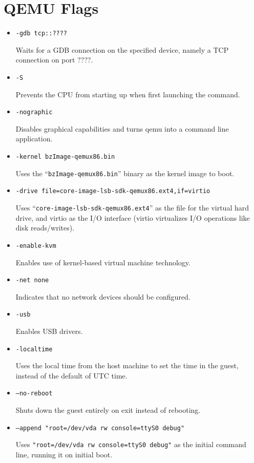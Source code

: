 \section{QEMU Flags}

\begin{itemize}
  \item \texttt{-gdb tcp::????}

    Waits for a GDB connection on the specified device, namely a TCP
    connection on port ????.

  \item \texttt{-S}

    Prevents the CPU from starting up when first launching the command.

  \item \texttt{-nographic}

    Disables graphical capabilities and turns qemu into a command line
    application.

  \item \texttt{-kernel bzImage-qemux86.bin}

    Uses the ``\texttt{bzImage-qemux86.bin}'' binary as the kernel image to boot.

  \item \texttt{-drive file=core-image-lsb-sdk-qemux86.ext4,if=virtio}

    Uses ``\texttt{core-image-lsb-sdk-qemux86.ext4}'' as the file for the virtual
    hard drive, and virtio as the I/O interface (virtio virtualizes I/O
    operations like disk reads/writes).

  \item \texttt{-enable-kvm}

    Enables use of kernel-based virtual machine technology.

  \item \texttt{-net none}

    Indicates that no network devices should be configured.

  \item \texttt{-usb}

    Enables USB drivers.

  \item \texttt{-localtime}

    Uses the local time from the host machine to set the time in the guest,
    instead of the default of UTC time.

  \item \texttt{--no-reboot}

    Shuts down the guest entirely on exit instead of rebooting.

  \item \texttt{--append "root=/dev/vda rw console=ttyS0 debug"}

    Uses \texttt{"root=/dev/vda rw console=ttyS0 debug"} as the initial command line,
    running it on initial boot.
\end{itemize}
